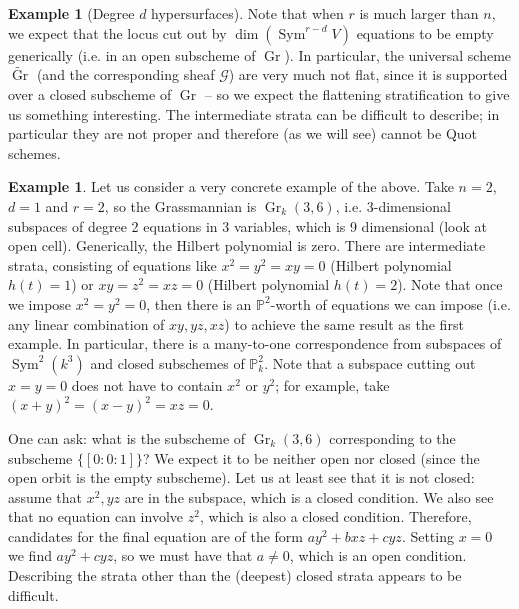 \documentclass[10pt]{article}
\theoremstyle{definition}
\newtheorem{exmp}[thm]{Example}
\DeclareMathOperator{\Sym}{Sym}
\newcommand{\PP}{\mathbb{P}}
\DeclareMathOperator{\Gr}{Gr}
\begin{document}
\begin{exmp}[Degree $d$ hypersurfaces]
Note that when $r$ is much larger than $n$, we expect that the locus cut out by $\dim(\Sym^{r-d}V)$ equations to be empty generically (i.e. in an open subscheme of $\Gr$).  In particular, the universal scheme $\widetilde{\Gr}$ (and the corresponding sheaf $\mathcal{G}$) are very much not flat, since it is supported over a closed subscheme of $\Gr$ -- so we expect the flattening stratification to give us something interesting.  The intermediate strata can be difficult to describe; in particular they are not proper and therefore (as we will see) cannot be Quot schemes.
\end{exmp}


\begin{exmp}
Let us consider a very concrete example of the above.  Take $n=2$, $d=1$ and $r=2$, so the Grassmannian is $\Gr_k(3, 6)$, i.e. 3-dimensional subspaces of degree 2 equations in 3 variables, which is 9 dimensional (look at open cell).  Generically, the Hilbert polynomial is zero.  There are intermediate strata, consisting of equations like $x^2 = y^2 = xy = 0$ (Hilbert polynomial $h(t) = 1$) or $xy = z^2 = xz = 0$ (Hilbert polynomial $h(t) = 2$).  Note that once we impose $x^2 = y^2 = 0$, then there is an $\mathbb{P}^2$-worth of equations we can impose (i.e. any linear combination of $xy, yz, xz$) to achieve the same result as the first example.  In particular, there is a many-to-one correspondence from subspaces of $\Sym^2(k^3)$ and closed subschemes of $\PP^2_k$.  Note that a subspace cutting out $x = y = 0$ does not have to contain $x^2$ or $y^2$; for example, take $(x+y)^2 = (x-y)^2 = xz = 0$.

One can ask: what is the subscheme of $\Gr_k(3,6)$ corresponding to the subscheme $\{[0:0:1]\}$?  We expect it to be neither open nor closed (since the open orbit is the empty subscheme).  Let us at least see that it is not closed: assume that $x^2, yz$ are in the subspace, which is a closed condition.  We also see that no equation can involve $z^2$, which is also a closed condition.  Therefore, candidates for the final equation are of the form $ay^2 + bxz + cyz$.  Setting $x=0$ we find $ay^2 + cyz$, so we must have that $a \ne 0$, which is an open condition.  Describing the strata other than the (deepest) closed strata appears to be difficult.
\end{exmp}
\end{document}
